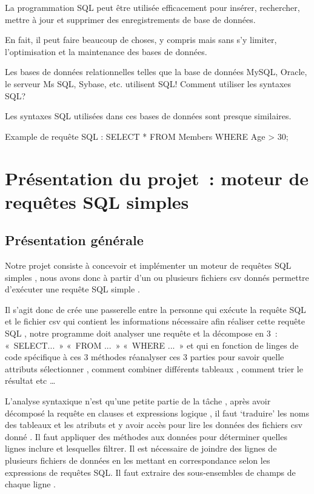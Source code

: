\documentclass[oneside,13pt,a4paper]{report}
\begin{document}
            La programmation SQL peut être utilisée efficacement pour insérer, rechercher, mettre à jour et supprimer des enregistrements de base de données.

            En fait, il peut faire beaucoup de choses, y compris mais sans s'y limiter, l'optimisation et la maintenance des bases de données.

            Les bases de données relationnelles telles que la base de données MySQL, Oracle, le serveur Ms SQL, Sybase, etc. utilisent SQL! Comment utiliser les syntaxes SQL?

            Les syntaxes SQL utilisées dans ces bases de données sont presque similaires.

            Example de requête SQL : SELECT * FROM Members WHERE Age > 30;

    \chapter{Présentation du projet : moteur de requêtes SQL simples}

    \section{Présentation générale}

        Notre projet consiste à concevoir et implémenter un moteur de requêtes SQL simples , nous avons donc à partir d’un ou plusieurs fichiers csv donnés permettre d’exécuter une requête SQL simple .

        Il s’agit  donc de crée une passerelle entre la personne qui exécute la requête SQL et le fichier csv qui contient les informations nécessaire afin réaliser cette requête SQL , notre programme doit analyser une requête et la décompose en 3 : « SELECT... » « FROM ... » « WHERE ... » et qui en fonction de linges de code spécifique à ces 3 méthodes réanalyser ces 3 parties pour savoir quelle attributs sélectionner , comment combiner différents tableaux , comment trier le résultat etc …

        L’analyse syntaxique n’est qu’une petite partie de la tâche , après avoir décomposé la requête en clauses et expressions logique , il faut ‘traduire’ les noms des tableaux et les atributs et y avoir accès pour lire les données des fichiers csv donné . Il faut appliquer des méthodes aux données pour déterminer quelles lignes inclure et lesquelles filtrer. Il est nécessaire de joindre des lignes de plusieurs fichiers de données en les mettant en correspondance selon les expressions de requêtes SQL. Il faut extraire des sous-ensembles de champs de chaque ligne .
\end{document}
